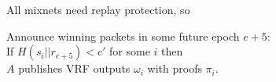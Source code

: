 \documentclass[fleqn,xcolor={usenames,dvipsnames},notes,aspectratio=169]{beamer} %
\begin{document}
\begin{frame}

All mixnets need replay protection, so 

\bigskip

Announce winning packets in some future epoch $e+5$: \\ \hspace*{3pt} 
If $H(s_i || r_{e+5}) < c'$ for some $i$ then \\ \hspace*{3pt} 
 $A$ publishes VRF outputs $\omega_i$ with proofs $\pi_i$.

\end{frame}


\begin{frame}

\end{frame}
\end{document}

